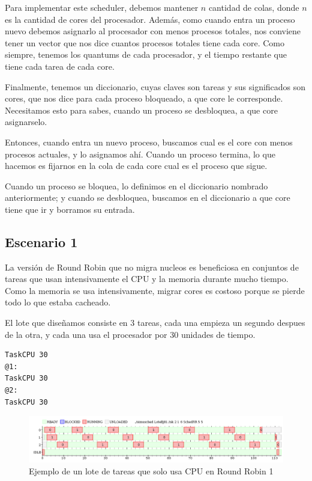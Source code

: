 

Para implementar este scheduler, debemos mantener $n$ cantidad de colas, donde $n$ es la cantidad de cores del procesador. Además, como cuando entra un proceso nuevo debemos asignarlo al procesador con menos procesos totales, nos conviene tener un vector que nos dice cuantos procesos totales tiene cada core. Como siempre, tenemos los quantums de cada procesador, y el tiempo restante que tiene cada tarea de cada core. 

Finalmente, tenemos un diccionario, cuyas claves son tareas y sus significados son cores, que nos dice para cada proceso bloqueado, a que core le corresponde. Necesitamos esto para sabes, cuando un proceso se desbloquea, a que core asignarselo.

Entonces, cuando entra un nuevo proceso, buscamos cual es el core con menos procesos actuales, y lo asignamos ahí. Cuando un proceso termina, lo que hacemos es fijarnos en la cola de cada core cual es el proceso que sigue.

Cuando un proceso se bloquea, lo definimos en el diccionario nombrado anteriormente; y cuando se desbloquea, buscamos en el diccionario a que core tiene que ir y borramos su entrada.

\subsection{Escenario 1}

La versión de Round Robin que no migra nucleos es beneficiosa en conjuntos de tareas que usan intensivamente el CPU y la memoria durante mucho tiempo. Como la memoria se usa intensivamente, migrar cores es costoso porque se pierde todo lo que estaba cacheado. 

El lote que diseñamos consiste en 3 tareas, cada una empieza un segundo despues de la otra, y cada una usa el procesador por 30 unidades de tiempo.

\begin{lstlisting}
TaskCPU 30
@1:
TaskCPU 30
@2:
TaskCPU 30
\end{lstlisting}


\begin{figure}[H]
\caption{Ejemplo de un lote de tareas que solo usa CPU en Round Robin 1}
\label{fig:ej8-11}
\includegraphics[width=0.9\columnwidth]{imgs/ej8-1rr.png}
\end{figure}

